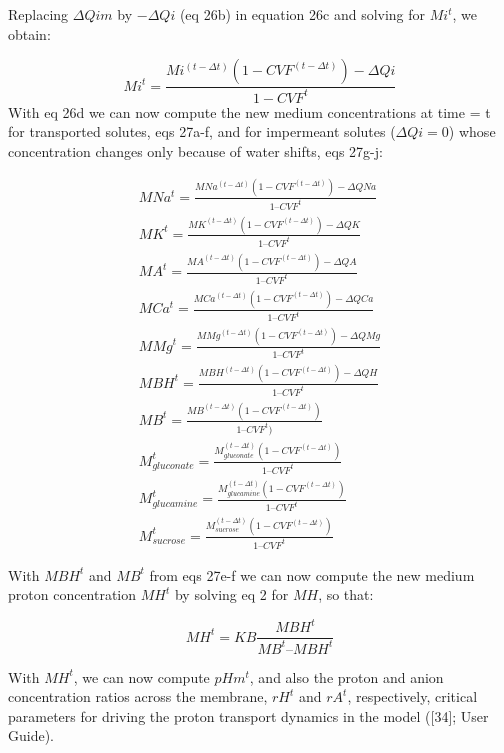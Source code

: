 \documentclass[a4paper]{article}
\newcommand{\med}[1]{M#1}
\newcommand{\MA}{\med{A}}
\newcommand{\MB}{\med{B}}
\newcommand{\MBH}{\med{BH}}
\newcommand{\MGluca}{M_{glucamine}}
\newcommand{\MNa}{\med{Na}}
\newcommand{\MK}{\med{K}}
\newcommand{\MGluco}{M_{gluconate}}
\newcommand{\MH}{\med{H}}
\newcommand{\MCa}{\med{Ca}}
\newcommand{\MMg}{\med{Mg}}
\newcommand{\MSuc}{M_{sucrose}}
\begin{document}
Replacing $\Delta Qim$ by $-\Delta Qi$ (eq 26b) in equation 26c and solving for $Mi^t$, we obtain:

\begin{equation}
Mi^t = \frac{Mi^{(t-\Delta t)}(1 - CVF^{(t-\Delta t)}) - \Delta Qi}{1 - CVF^t}
\end{equation}
With eq 26d we can now compute the new medium concentrations at time = t for transported solutes, eqs 27a-f, and for impermeant solutes ($\Delta Qi = 0$) whose concentration changes only because of water shifts, eqs 27g-j:

\setcounter{equation}{0}
\renewcommand{\theequation}{27\alph{equation}}

\begin{eqnarray}
\MNa^t = \frac{\MNa^{(t-\Delta t)}(1-CVF^{(t-\Delta t)}) - \Delta QNa}{1 – CVF^t }\\
\MK^t = \frac{\MK^{(t-\Delta t)}(1-CVF^{(t-\Delta t)}) - \Delta QK}{1 – CVF^t }\\
\MA^t = \frac{\MA^{(t-\Delta t)}(1-CVF^{(t-\Delta t)}) - \Delta QA}{1 – CVF^t }\\
\MCa^t = \frac{\MCa^{(t-\Delta t)}(1-CVF^{(t-\Delta t)}) - \Delta QCa}{1 – CVF^t }\\
\MMg^t = \frac{\MMg^{(t-\Delta t)}(1-CVF^{(t-\Delta t)}) - \Delta QMg}{1 – CVF^t }\\
\MBH^t = \frac{\MBH^{(t-\Delta t)}(1-CVF^{(t-\Delta t)}) - \Delta QH}{1 – CVF^t }\\
\MB^t = \frac{\MB^{(t-\Delta t)}(1-CVF^{(t-\Delta t)})}{1 – CVF^t) }\\
\MGluco^t = \frac{\MGluco^{(t-\Delta t)}(1-CVF^{(t-\Delta t)})}{1 – CVF^t }\\
\MGluca^t = \frac{\MGluca^{(t-\Delta t)}(1-CVF^{(t-\Delta t)})}{1 – CVF^t }\\
\MSuc^t = \frac{\MSuc^{(t-\Delta t)}(1-CVF^{(t-\Delta t)})}{1 – CVF^t} 
\end{eqnarray}

With $MBH^t$ and $MB^t$ from eqs 27e-f we can now compute the new medium proton concentration $MH^t$ by solving eq 2 for $MH$, so that:

\setcounter{equation}{0}
\renewcommand{\theequation}{28\alph{equation}}

\begin{equation}
\MH^t = KB\frac{\MBH^t}{\MB^t – \MBH^t}
\end{equation}

With $MH^t$, we can now compute $pHm^t$, and also the proton and anion concentration ratios across the membrane, $rH^t$ and $rA^t$, respectively, critical parameters for driving the proton transport dynamics in the model ([34]; User Guide).
\end{document}
